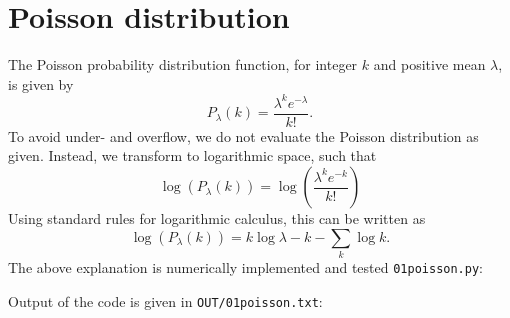\section{Poisson distribution}
The Poisson probability distribution function, for integer $k$ and positive mean $\lambda$, is given by
\begin{equation}
	P_\lambda(k) = \frac{\lambda^k e^{-\lambda}}{k!}.
\end{equation}
To avoid under- and overflow, we do not evaluate the Poisson distribution as given. Instead, we transform to logarithmic space, such that
\begin{equation}
	\log\left(P_\lambda(k)\right) = \log\left(\frac{\lambda^k e^{-k}}{k!}\right)
\end{equation}
Using standard rules for logarithmic calculus, this can be written as
\begin{equation}
	\log\left(P_\lambda(k)\right) = k\log{\lambda} - k - \sum_k \log{k}.
\end{equation}
The above explanation is numerically implemented and tested \texttt{01poisson.py}:



Output of the code is given in \texttt{OUT/01poisson.txt}:


